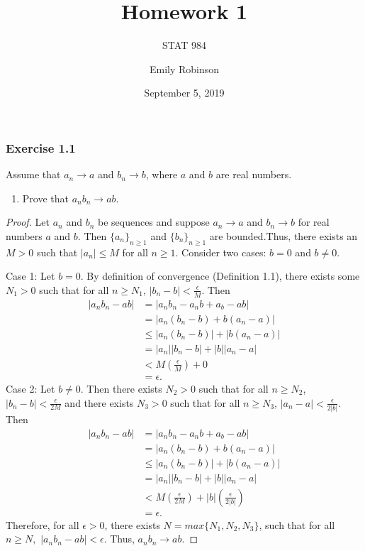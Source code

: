 \documentclass[12pt,]{article}
\title{Homework 1}
\subtitle{STAT 984}
\author{Emily Robinson}
\date{September 5, 2019}
\providecommand{\tightlist}{%
  \setlength{\itemsep}{0pt}\setlength{\parskip}{0pt}}
\begin{document}
\maketitle

\hypertarget{exercise-1.1}{%
\subsubsection{Exercise 1.1}\label{exercise-1.1}}

Assume that \(a_n \rightarrow a\) and \(b_n \rightarrow b\), where \(a\)
and \(b\) are real numbers.

\begin{enumerate}
\def\labelenumi{\alph{enumi}.}
\tightlist
\item
  Prove that \(a_nb_n \rightarrow ab\).
\end{enumerate}

\begin{proof}
Let $a_n$ and $b_n$ be sequences and suppose $a_n \rightarrow a$ and $b_n \rightarrow b$ for real numbers $a$ and $b$. Then $\{a_n\}_{n\ge1}$ and $\{b_n\}_{n\ge1}$ are bounded.Thus, there exists an $M>0$ such that $|a_n|\le M$ for all $n\ge 1$. Consider two cases: $b=0$ and $b\ne 0$.

Case 1: Let $b = 0$. By definition of convergence (Definition 1.1), there exists some $N_1>0$ such that for all $n\ge N_1$, $|b_n-b|<\frac{\epsilon}{M}.$ Then
\begin{align*}
|a_nb_n-ab| & = |a_nb_n-a_nb+a_b-ab|\\
& = |a_n(b_n-b)+b(a_n-a)|\\
& \le |a_n(b_n-b)| +|b(a_n-a)|\\
& =|a_n||b_n-b|+|b||a_n-a|\\
& < M\left(\frac{\epsilon}{M}\right)+0\\
& = \epsilon.
\end{align*}
Case 2: Let $b \ne 0$. Then there exists $N_2>0$ such that for all $n\ge N_2$, $|b_n-b|<\frac{\epsilon}{2M}$ and there exists $N_3>0$ such that for all $n \ge N_3$, $|a_n-a|<\frac{\epsilon}{2|b|}$. Then
\begin{align*}
|a_nb_n-ab| & = |a_nb_n-a_nb+a_b-ab|\\
& = |a_n(b_n-b)+b(a_n-a)|\\
& \le |a_n(b_n-b)| +|b(a_n-a)|\\
& =|a_n||b_n-b|+|b||a_n-a|\\
& < M\left(\frac{\epsilon}{2M}\right)+|b|\left(\frac{\epsilon}{2|b|}\right)\\
& = \epsilon.
\end{align*}
Therefore, for all $\epsilon>0$, there exists $N = max\{N_1, N_2, N_3\}$, such that for all $n\ge N,$ $|a_nb_n-ab|<\epsilon.$ Thus, $a_nb_n\rightarrow ab.$
\end{proof}
\end{document}
